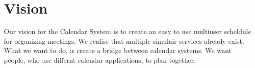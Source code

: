 \section{Vision}
Our vision for the Calendar System is to create an easy to use multiuser
scheldule for organizing meetings. We realise that multiple simulair services
already exist. What we want to do, is create a bridge between calendar systems. We want people, who use differnt calendar applications, to plan together.
